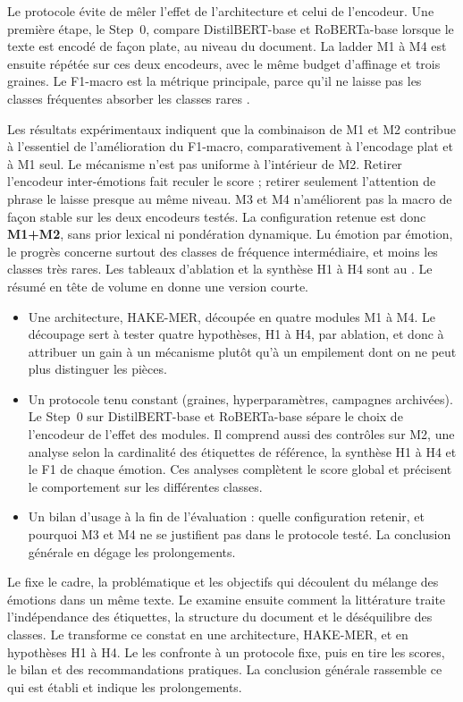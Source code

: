 Le protocole évite de mêler l'effet de l'architecture et celui de
l'encodeur. Une première étape, le Step~0, compare DistilBERT-base et
RoBERTa-base lorsque le texte est encodé de façon plate, au niveau du
document. La ladder M1 à M4 est ensuite répétée sur ces deux encodeurs,
avec le même budget d'affinage et trois graines. Le F1-macro est la
métrique principale, parce qu'il ne laisse pas les classes fréquentes
absorber les classes rares
\cite{bond2022multilabel,wu2021multilabelranking,zhang2014multilabel}.

Les résultats expérimentaux indiquent que la combinaison de M1 et M2
contribue à l'essentiel de l'amélioration du F1-macro, comparativement
à l'encodage plat et à M1 seul. Le mécanisme n'est pas
uniforme à l'intérieur de M2. Retirer l'encodeur inter-émotions fait
reculer le score ; retirer seulement l'attention de phrase le laisse
presque au même niveau. M3 et M4 n'améliorent pas la macro de façon
stable sur les deux encodeurs testés. La configuration retenue est donc
\textbf{M1+M2}, sans prior lexical ni pondération dynamique. Lu émotion
par émotion, le progrès concerne surtout des classes de fréquence
intermédiaire, et moins les classes très rares. Les tableaux d'ablation
et la synthèse H1 à H4 sont au . Le résumé en
tête de volume en donne une version courte.

\begin{itemize}[noitemsep]
\item Une architecture, HAKE-MER, découpée en quatre modules M1 à M4.
      Le découpage sert à tester quatre hypothèses, H1 à H4, par
      ablation, et donc à attribuer un gain à un mécanisme plutôt qu'à
      un empilement dont on ne peut plus distinguer les pièces.
\item Un protocole tenu constant (graines, hyperparamètres, campagnes
      archivées). Le Step~0 sur DistilBERT-base et RoBERTa-base sépare
      le choix de l'encodeur de l'effet des modules. Il comprend aussi
      des contrôles sur M2, une analyse selon la cardinalité des
      étiquettes de référence, la synthèse H1 à H4 et le F1 de chaque
      émotion. Ces analyses complètent le score global et précisent le
      comportement sur les différentes classes.
\item Un bilan d'usage à la fin de l'évaluation : quelle configuration
      retenir, et pourquoi M3 et M4 ne se justifient pas dans le
      protocole testé. La conclusion générale en dégage les
      prolongements.
\end{itemize}

Le  fixe le cadre, la problématique et les objectifs
qui découlent du mélange des émotions dans un même texte. Le
 examine ensuite comment la littérature traite
l'indépendance des étiquettes, la structure du document et le
déséquilibre des classes. Le  transforme ce constat
en une architecture, HAKE-MER, et en hypothèses H1 à H4. Le
 les confronte à un protocole fixe, puis en
tire les scores, le bilan et des recommandations pratiques. La
conclusion générale rassemble ce qui est établi et indique les
prolongements.

